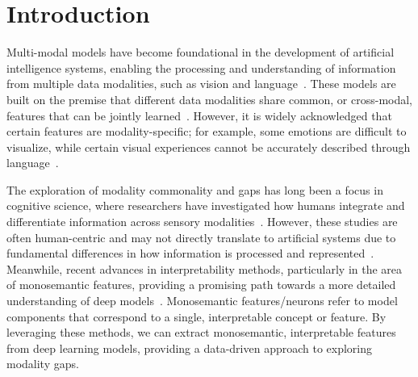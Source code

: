 


\section{Introduction}

Multi-modal models have become foundational in the development of artificial intelligence systems, enabling the processing and understanding of information from multiple data modalities, such as vision and language~\citep{radford2021learning, kim2021vilt, lu2019vilbert}. These models are built on the premise that different data modalities share common, or cross-modal, features that can be jointly learned~\citep{ngiam2011multimodal}. However, it is widely acknowledged that certain features are modality-specific; for example, some emotions are difficult to visualize, while certain visual experiences cannot be accurately described through language~\citep{paivio1991dual}.

The exploration of modality commonality and gaps has long been a focus in cognitive science, where researchers have investigated how humans integrate and differentiate information across sensory modalities~\citep{spence2011crossmodal}. However, these studies are often human-centric and may not directly translate to artificial systems due to fundamental differences in how information is processed and represented~\citep{calvert2004handbook}. Meanwhile, recent advances in interpretability methods, particularly in the area of monosemantic features, providing a promising path towards a more detailed understanding of deep models~\citep{elhage2022solu,bills2023language,Gurnee2023FindingNI,Yan2024EncourageOI}. Monosemantic features/neurons refer to model components that correspond to a single, interpretable concept or feature. By leveraging these methods, we can extract monosemantic, interpretable features from deep learning models, providing a data-driven approach to exploring modality gaps.


